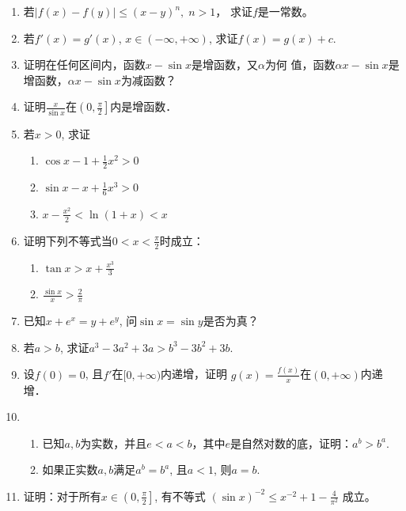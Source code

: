 \begin{ex}
\begin{enumerate}
    \item     若$|f(x)-f(y)|\le (x-y)^n,\; n>1$，
   求证$f$是一常数。
    \item 若$f'(x)=g'(x)$, $x\in(-\infty,+\infty)$, 求证$f(x)=g (x) +c$.
    \item 证明在任何区间内，函数$x-\sin x$是增函数，又$\alpha$为何
    值，函数$\alpha x-\sin x$是增函数，$\alpha x-\sin x$为减函数？
    \item 证明$\frac{x}{\sin x}$在$\left(0,\frac{\pi}{2}\right]$内是增函数．
    \item 若$x>0$, 求证
\begin{multicols}{2}
  \begin{enumerate}
\item  $\cos x-1+\frac{1}{2}x^2> 0$
\item $\sin x-x+\frac{1}{6}x^3> 0$
\item  $x-\frac{x^2}{2}<\ln (1+x)<x$
\end{enumerate}  
\end{multicols}

\item 证明下列不等式当$0<x<\frac{\pi}{2}$时成立：
\begin{multicols}{2}
    \begin{enumerate}
        \item $\tan x> x+\frac{x^3}{3}$
        \item $\frac{\sin x}{x}> \frac{2}{\pi}$
    \end{enumerate}
\end{multicols}

\item 已知$x+e^x=y+e^y$, 问$\sin x=\sin y$是否为真？
\item 若$a>b$, 求证$a^3-3a^2+3a>b^3-3b^2+3b$.
\item 设$f(0)=0$, 且$f'$在$[0,+\infty)$内递增，证明
$ g(x) =\frac{f (x)}{x}$在$(0,+\infty)$内递增．
\item 
\begin{enumerate}
    \item 已知$a,b$为实数，并且$e<a<b$，其中$e$是自然对数的底，证明：$a^b>b^a$.
    \item 如果正实数$a,b$满足$a^b=b^a$, 且$a<1$, 则$a=b$.
\end{enumerate}

\item 证明：对于所有$x\in\left(0,\frac{\pi}{2}\right]$, 有不等式
$(\sin x)^{-2}\le x^{-2}+1-\frac{4}{\pi^2}$
成立。
\end{enumerate}
\end{ex}


